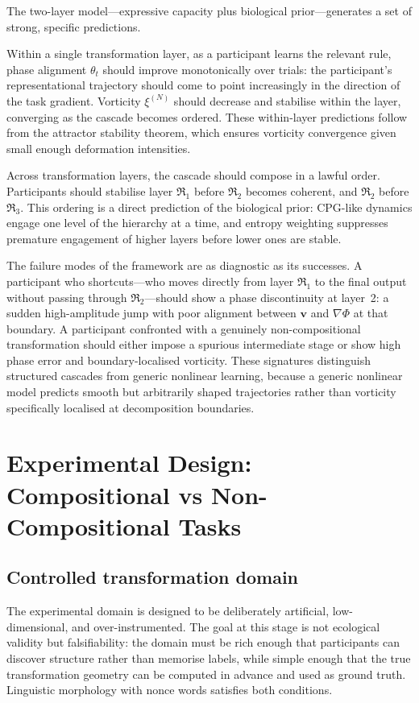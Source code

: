 \documentclass[12pt, a4paper]{article}
\theoremstyle{remark}
\theoremstyle{definition}
\newcommand{\Rk}{\mathfrak{R}}
\newcommand{\vv}{\mathbf{v}}
\newcommand{\Phif}{\Phi}
\begin{document}
The two-layer model---expressive capacity plus biological prior---generates a set of strong,
specific predictions.

Within a single transformation layer, as a participant learns the relevant rule, phase
alignment $\theta_t$ should improve monotonically over trials: the participant's
representational trajectory should come to point increasingly in the direction of the task
gradient.  Vorticity $\xi^{(N)}$ should decrease and stabilise within the layer, converging
as the cascade becomes ordered.  These within-layer predictions follow from the attractor
stability theorem, which ensures vorticity convergence given small enough deformation
intensities.

Across transformation layers, the cascade should compose in a lawful order.  Participants
should stabilise layer $\Rk_1$ before $\Rk_2$ becomes coherent, and $\Rk_2$ before
$\Rk_3$.  This ordering is a direct prediction of the biological prior: CPG-like dynamics
engage one level of the hierarchy at a time, and entropy weighting suppresses premature
engagement of higher layers before lower ones are stable.

The failure modes of the framework are as diagnostic as its successes.  A participant who
shortcuts---who moves directly from layer $\Rk_1$ to the final output without passing
through $\Rk_2$---should show a phase discontinuity at layer~2: a sudden high-amplitude
jump with poor alignment between $\vv$ and $\nabla\Phif$ at that boundary.  A participant
confronted with a genuinely non-compositional transformation should either impose a
spurious intermediate stage or show high phase error and boundary-localised vorticity.
These signatures distinguish structured cascades from generic nonlinear learning, because
a generic nonlinear model predicts smooth but arbitrarily shaped trajectories rather than
vorticity specifically localised at decomposition boundaries.

\section{Experimental Design: Compositional vs Non-Compositional Tasks}
\label{sec:experiment}

\subsection{Controlled transformation domain}

The experimental domain is designed to be deliberately artificial, low-dimensional, and
over-instrumented.  The goal at this stage is not ecological validity but falsifiability:
the domain must be rich enough that participants can discover structure rather than memorise
labels, while simple enough that the true transformation geometry can be computed in
advance and used as ground truth.  Linguistic morphology with nonce words satisfies both
conditions.
\end{document}
